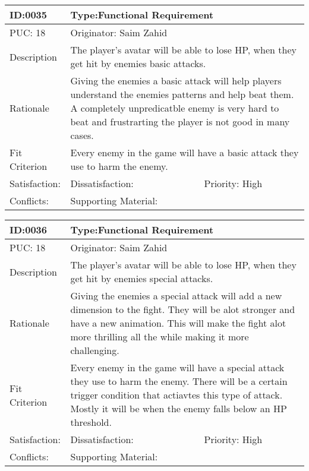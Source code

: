 \documentclass{article}
\begin{document}
	\begin{table}[H]
		\begin{tabular}{|l|l|l|}
			\hline
			ID:0035 & \multicolumn{2}{l|}{Type:Functional Requirement} \\ \hline
			PUC: 18 & \multicolumn{2}{l|}{Originator: Saim Zahid} \\ \hline
			Description & \multicolumn{2}{m{0.85\textwidth}|}{The player's avatar will be able to lose HP, when they get hit by enemies basic attacks.} \\ \hline
			Rationale & \multicolumn{2}{m{0.85\textwidth}|}{Giving the enemies a basic attack will help players understand the enemies patterns and help beat them. A completely unpredicatble enemy is very hard to beat and frustrarting the player is not good in many cases.} \\ \hline
			Fit Criterion & \multicolumn{2}{m{0.85\textwidth}|}{Every enemy in the game will have a basic attack they use to harm the enemy.} \\ \hline
			Satisfaction: & Dissatisfaction: & Priority: High\\ \hline
			Conflicts: & \multicolumn{2}{l|}{Supporting Material:} \\ \hline
		\end{tabular}
	\end{table}

	\begin{table}[H]
		\begin{tabular}{|l|l|l|}
			\hline
			ID:0036 & \multicolumn{2}{l|}{Type:Functional Requirement} \\ \hline
			PUC: 18 & \multicolumn{2}{l|}{Originator: Saim Zahid} \\ \hline
			Description & \multicolumn{2}{m{0.85\textwidth}|}{The player's avatar will be able to lose HP, when they get hit by enemies special attacks.} \\ \hline
			Rationale & \multicolumn{2}{m{0.85\textwidth}|}{Giving the enemies a special attack will add a new dimension to the fight. They will be alot stronger and have a new animation. This will make the fight alot more thrilling all the while making it more challenging.} \\ \hline
			Fit Criterion & \multicolumn{2}{m{0.85\textwidth}|}{Every enemy in the game will have a special attack they use to harm the enemy. There will be a certain trigger condition that actiavtes this type of attack. Mostly it will be when the enemy falls below an HP threshold.} \\ \hline
			Satisfaction: & Dissatisfaction: & Priority: High\\ \hline
			Conflicts: & \multicolumn{2}{l|}{Supporting Material:} \\ \hline
		\end{tabular}
	\end{table}
\end{document}
